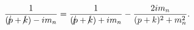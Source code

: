 \begin{equation}
{1 \over {({p\kern-0.15em\raise0.17ex\llap{/}\kern0.15em\relax} +
{k\kern-0.15em\raise0.17ex\llap{/}\kern0.15em\relax}) -i m_n}} =
{1 \over {({p\kern-0.15em\raise0.17ex\llap{/}\kern0.15em\relax} +
{k\kern-0.15em\raise0.17ex\llap{/}\kern0.15em\relax}) +i m_n}} -
{2i m_n \over {(p + k)^2 + m^2_n}}.\label{two}
\end{equation}

